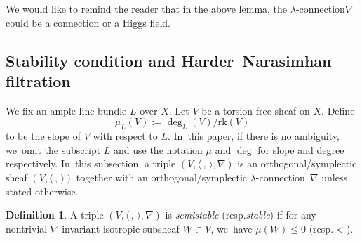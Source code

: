\documentclass[11pt]{article}
\newcommand{\resp}{resp.\xspace}
\numberwithin{equation}{section}
\newcommand{\lconnection}{$\lambda$\nobreakdash-con\-nec\-tion\xspace}
\newcommand{\rk}{\mathrm{rk}}
\theoremstyle{plain}
\theoremstyle{definition}
\newtheorem{defn}[thm]{Definition}
\begin{document}
We would like to remind the reader that in the above lemma, the \lconnection $\nabla$ could be a connection or a Higgs field.

\subsection{Stability condition and Harder--Narasimhan filtration}\label{subsect_stab_cond}
We fix an ample line bundle $L$ over $X$. Let $V$ be a torsion free sheaf on $X$. Define
\[
\mu_L(V):=\deg_L(V)/\rk(V)
\]
to be the slope of $V$ with respect to $L$. In~this paper, if there is no ambiguity, we~omit the subscript $L$ and use the notation $\mu$ and $\deg$ for slope and degree respectively. In~this subsection, a triple $(V,\langle \,, \, \rangle,\nabla)$ is an orthogonal/symplectic sheaf $(V,\langle \,, \, \rangle)$ together with an orthogonal/symplectic \lconnection~$\nabla$ unless stated otherwise.

\begin{defn}\label{defn_stab}
A triple $(V,\langle \,, \, \rangle,\nabla)$ is \emph{semistable} (\resp \emph{stable}) if for any nontrivial $\nabla$-invariant isotropic subsheaf $W \subset V$, we~have $\mu(W)\leqslant 0$ (\resp $<$).
\end{defn}
\end{document}
